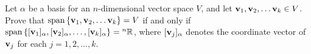 \documentclass[10pt]{exam}
\newcommand{\tb}{\textbf}
\newcommand{\noin}{\noindent}
\begin{document}
\vspace{0.2in}
{\large 
{} 

\vspace{0.2in}


}

\vfill


\pagebreak


\noin {\tb 1.}   Let $\alpha$ be a basis for an $n$-dimensional vector space $V$, and let ${\bf v}_1, {\bf v}_2, \dots {\bf v}_k \in V$.  Prove that $\mathrm{span}\, \{ {\bf v}_1, {\bf v}_2, \dots {\bf v}_k \}=V$ if and only if $\mathrm{span}\, \{ [{\bf v}_1]_{\alpha}, [{\bf v}_2]_{\alpha}, \dots, [{\bf v}_k]_{\alpha} \} = {^n}\mathbb R$, where $[{\bf v}_j]_{\alpha}$ denotes the coordinate vector of ${\bf v}_j$ for each $j=1,2,\dots,k.$
\end{document}
